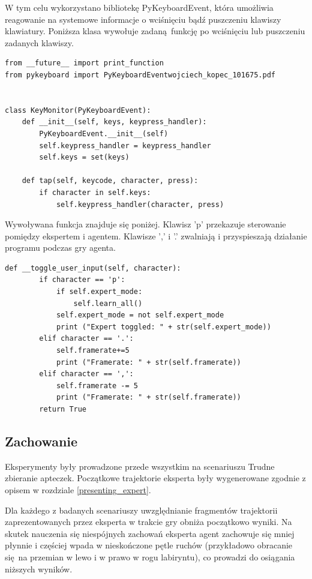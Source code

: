 \documentclass[polish,master,a4paper,oneside]{ppfcmthesis}
\begin{document}
W tym celu wykorzystano bibliotekę PyKeyboardEvent, która umożliwia reagowanie na systemowe informacje o wciśnięciu bądź puszczeniu klawiszy klawiatury. Poniższa klasa wywołuje zadaną funkcję po wciśnięciu lub puszczeniu zadanych klawiszy.


\begin{lstlisting}[language=iPython]
from __future__ import print_function
from pykeyboard import PyKeyboardEventwojciech_kopec_101675.pdf


class KeyMonitor(PyKeyboardEvent):
    def __init__(self, keys, keypress_handler):
        PyKeyboardEvent.__init__(self)
        self.keypress_handler = keypress_handler
        self.keys = set(keys)

    def tap(self, keycode, character, press):
        if character in self.keys:
            self.keypress_handler(character, press)
\end{lstlisting}

Wywoływana funkcja znajduje się poniżej. Klawisz 'p' przekazuje sterowanie pomiędzy ekspertem i agentem. Klawisze ',' i '.' zwalniają i przyspieszają działanie programu podczas gry agenta.

\begin{lstlisting}[language=iPython]
    def __toggle_user_input(self, character):
        if character == 'p':
            if self.expert_mode:
                self.learn_all()
            self.expert_mode = not self.expert_mode
            print ("Expert toggled: " + str(self.expert_mode))
        elif character == '.':
            self.framerate+=5
            print ("Framerate: " + str(self.framerate))
        elif character == ',':
            self.framerate -= 5
            print ("Framerate: " + str(self.framerate))
        return True
\end{lstlisting}

\subsection{Zachowanie}
Eksperymenty były prowadzone przede wszystkim na scenariuszu Trudne zbieranie apteczek. Początkowe trajektorie eksperta były wygenerowane zgodnie z opisem w rozdziale \ref{presenting_expert}.

Dla każdego z badanych scenariuszy uwzględnianie fragmentów trajektorii zaprezentowanych przez eksperta w trakcie gry obniża początkowo wyniki. Na skutek nauczenia się niespójnych zachowań eksperta agent zachowuje się mniej płynnie i częściej wpada w nieskończone pętle ruchów (przykładowo obracanie się na przemian w lewo i w prawo w rogu labiryntu), co prowadzi do osiągania niższych wyników.
\end{document}
